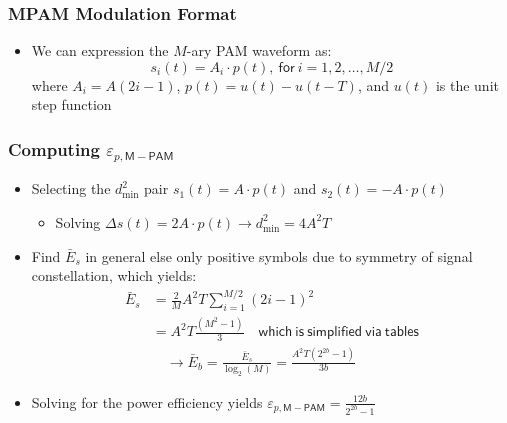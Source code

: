\documentclass[10pt]{beamer}
\begin{document}
\frame
{
  \frametitle{MPAM Modulation Format}

  \begin{itemize}
    \item We can expression the $M$-ary PAM waveform as:
    \begin{equation}
        s_i(t)=A_i\cdot{p(t)},~\mathsf{for}~i=1,2,\ldots,M/2
    \end{equation}
    where $A_i=A(2i-1)$, $p(t)=u(t)-u(t-T)$, and $u(t)$ is the unit step function
  \end{itemize}
  
}
\frame
{
  \frametitle{Computing $\varepsilon_{p,\mathsf{M-PAM}}$}

    \begin{itemize}
        \item Selecting the $d_{\min}^2$ pair $s_1(t)=A\cdot{p(t)}$ and $s_2(t)=-A\cdot{p(t)}$
        \begin{itemize}
            \item Solving $\Delta{s(t)}=2A\cdot{p(t)}\rightarrow{d_{\min}^2}=4A^2T$
        \end{itemize}
        \item Find $\bar{E}_s$ in general else only positive symbols due to symmetry of signal constellation, which yields:
        \begin{equation}
        \begin{split}
            \bar{E}_s&=\frac{2}{M}A^2T\sum\limits_{i=1}^{M/2}(2i-1)^2\\
            &=A^2T\frac{(M^2-1)}{3}\quad\mathsf{which~is~simplified~via~tables}\\
            &\quad\rightarrow{\bar{E}_b=\frac{\bar{E}_s}{\log_2(M)}}=\frac{A^2T(2^{2b}-1)}{3b}\nonumber
        \end{split}
        \end{equation}
        \item Solving for the power efficiency yields $\varepsilon_{p,\mathsf{M-PAM}}=\frac{12b}{2^{2b}-1}$
    \end{itemize}

}
\end{document}
